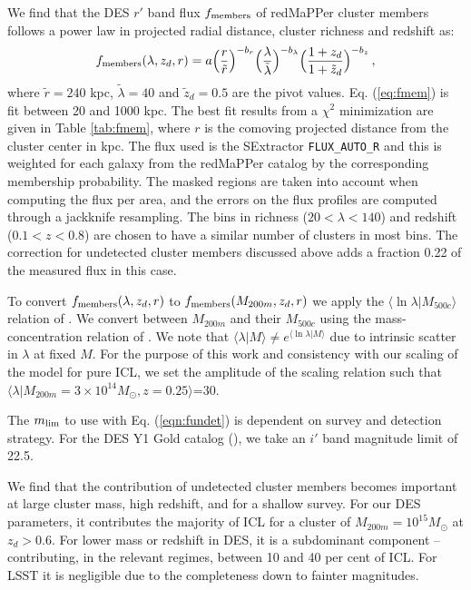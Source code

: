 {We find that the DES $r'$ band flux $f_{\rm members}$ of redMaPPer cluster members follows a power law in projected radial distance, cluster richness and redshift as:
\begin{equation}
f_{\rm members}(\lambda, z_{d}, r) = a \Big(\frac{r}{\tilde{r}} \Big)^{-b_r} \Big(\frac{\lambda}{\tilde{\lambda}}\Big)^{-b_\lambda} \Big(\frac{1+z_d}{1+\tilde{z}_d}\Big)^{-b_z} \,,\label{eq:fmem}
\end{equation}
where $\tilde{r}=240$ kpc, $\tilde{\lambda}=40$ and $\tilde{z}_d=0.5$ are the pivot values.
Eq. (\ref{eq:fmem}) is fit between 20 and 1000 kpc. The best fit results from a $\chi^2$ minimization are given in Table \ref{tab:fmem}, where $r$ is the comoving projected distance from the cluster center in kpc. The flux used is the SExtractor \texttt{FLUX\_AUTO\_R} and this is weighted for each galaxy from the redMaPPer catalog by the corresponding membership probability. The masked regions are taken into account when computing the flux per area, and the errors on the flux profiles are computed through a jackknife resampling. The bins in richness ($20<\lambda<140$) and redshift ($0.1<z<0.8$) are chosen to have a similar number of clusters in most bins. The correction for undetected cluster members discussed above adds a fraction 0.22 of the measured flux in this case.

To convert $f_{\rm members}(\lambda, z_{d}, r)$ to $f_{\rm members}(M_{200m}, z_{d}, r)$ we apply the $\langle\ln\lambda|M_{500c}\rangle$ relation of \citet{2015MNRAS.454.2305S}. We convert between $M_{200m}$ and their $M_{500c}$ using the mass-concentration relation of \citet{2008MNRAS.390L..64D}. We note that $\langle\lambda|M\rangle\neq e^{\langle\ln\lambda|M\rangle}$ due to intrinsic scatter in $\lambda$ at fixed $M$. For the purpose of this work and consistency with our scaling of the \citet{icl} model for pure ICL, we set the amplitude of the scaling relation such that $\langle\lambda|M_{200m}=3\times10^{14}M_{\odot},z=0.25\rangle$=30.

The $m_{\rm lim}$ to use with Eq. (\ref{eqn:fundet}) is dependent on survey and detection strategy. For the DES Y1 Gold catalog (\citealt{2017arXiv170801531D}), we take an $i'$ band magnitude limit of 22.5.

We find that the contribution of undetected cluster members becomes important at large cluster mass, high redshift, and for a shallow survey. For our DES parameters, it contributes the majority of ICL for a cluster of $M_{200m}=10^{15}M_{\odot}$ at $z_d>0.6$. For lower mass or redshift in DES, it is a subdominant component -- contributing, in the relevant regimes, between 10 and 40 per cent of ICL. For LSST it is negligible due to the completeness down to fainter magnitudes.

}
